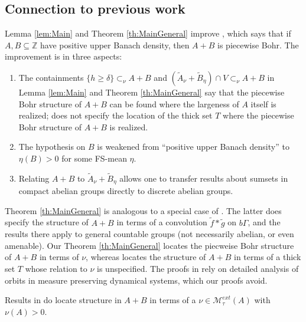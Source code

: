 \documentclass[12pt]{amsart} \usepackage{amsmath,centernot,amssymb,leftindex}
\numberwithin{theorem}{section}
\numberwithin{equation}{section}
\theoremstyle{definition}
\begin{document}
	
	\subsection{Connection to previous work}	Lemma \ref{lem:Main} and	Theorem \ref{th:MainGeneral} improve \cite[Theorem I]{BergelsonFurstenbergWeiss}, which says that if $A, B\subseteq \mathbb Z$ have positive upper Banach density, then $A+B$ is piecewise Bohr.  The improvement is in three aspects:
		
		\begin{enumerate}
			\item The containments $\{h\geq \delta\} \subset_\nu A+B$ and $(\tilde{A}_{\nu}+\tilde{B}_{\eta})\cap V \subset_{\nu} A+B $ in Lemma \ref{lem:Main} and Theorem \ref{th:MainGeneral} say that the piecewise Bohr structure of $A+B$ can be found where the largeness of $A$ itself is realized;  \cite[Theorem I]{BergelsonFurstenbergWeiss} does not specify the location of the thick set $T$ where the piecewise Bohr structure of $A+B$ is realized.
			
			\item The hypothesis on $B$ is weakened from ``positive upper Banach density'' to $\eta(B)>0$ for some FS-mean $\eta$.
			
			\item Relating $A+B$ to  $\tilde{A}_{\nu}+\tilde{B}_{\eta}$ allows one to transfer results about sumsets in compact abelian groups directly to discrete abelian groups.
		\end{enumerate}

	
	
	Theorem \ref{th:MainGeneral} is analogous to a special case of \cite[Proposition 1.10]{BjorklundFish_ProductSet}.  The latter does specify the structure of $A+B$ in terms of a convolution $\tilde{f}*\tilde{g}$ on $b\Gamma$, and the results there apply to general countable groups (not necessarily abelian, or even amenable).   Our Theorem \ref{th:MainGeneral} locates the piecweise Bohr structure of $A+B$ in terms of $\nu$, whereas \cite[Proposition 1.10]{BjorklundFish_ProductSet} locates the structure of $A+B$ in terms of a thick set $T$ whose relation to $\nu$ is unspecified.   The proofs in \cite{BjorklundFish_ProductSet} rely on detailed analysis of orbits in measure preserving dynamical systems, which our proofs avoid.
	
	Results in \cite{BjorklundFish_ApproxInvariance} do locate structure in $A+B$ in terms of a $\nu\in \mathcal M_{\tau}^{ext}(A)$ with $\nu(A)>0$.
	
\end{document}
